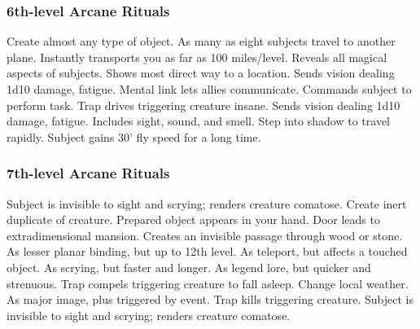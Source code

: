 \subsubsection{6th-level Arcane Rituals}
\begin{rituallist}
     Create almost any type of object.
    \F As many as eight subjects travel to another plane.
     Instantly transports you as far as 100 miles/level.
      Reveals all magical aspects of subjects.
     Shows most direct way to a location.
     Sends vision dealing 1d10 damage, fatigue.
     Mental link lets allies communicate.
     Commands subject to perform task.
     Trap drives triggering creature insane.
     Sends vision dealing 1d10 damage, fatigue.
     Includes sight, sound, and smell.
     Step into shadow to travel rapidly.
     Subject gains 30' fly speed for a long time.
\end{rituallist}

\subsubsection{7th-level Arcane Rituals}
\begin{rituallist}
     Subject is invisible to sight and scrying; renders creature comatose.
    \M Create inert duplicate of creature.
     Prepared object appears in your hand.
    \F Door leads to extradimensional mansion.
     Creates an invisible passage through wood or stone.
     As lesser planar binding, but up to 12th level.
     As teleport, but affects a touched object.
     As scrying, but faster and longer.
     As legend lore, but quicker and strenuous.
     Trap compels triggering creature to fall asleep.
     Change local weather.
     As major image, plus triggered by event.
     Trap kills triggering creature.
     Subject is invisible to sight and scrying; renders creature comatose.
\end{rituallist}

